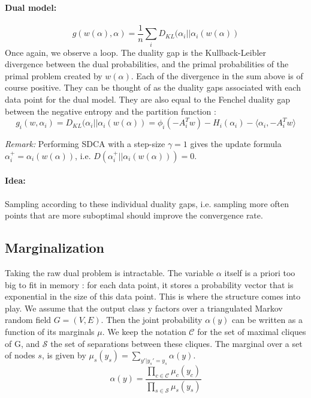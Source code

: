 \documentclass{article}
\begin{document}
\paragraph{Dual model:}

\begin{equation}
	g(w(\alpha),\alpha) = \frac{1}{n} \sum_i D_{KL} (\alpha_i || \alpha_i(w(\alpha))
\end{equation}
Once again, we observe a loop. The duality gap is the Kullback-Leibler divergence between the dual probabilities, and the primal  probabilities of the primal problem created by $w(\alpha)$. Each of the divergence in the sum above is of course positive. They can be thought of as the duality gaps associated with each data point for the dual model. They are also equal to the Fenchel duality gap between the negative entropy and the partition function :
\begin{equation*}
	g_i(w,\alpha_i) = D_{KL} (\alpha_i || \alpha_i(w(\alpha)) = \phi_i(-A_i^T w) - H_i(\alpha_i) - \langle \alpha_i, -A_i^T w\rangle 
\end{equation*}

\textit{Remark:} Performing SDCA with a step-size $\gamma=1$  gives the update formula $\alpha_i^+ = \alpha_i(w(\alpha))$, i.e. $ D(\alpha_i^+ || \alpha_i(w(\alpha)) )=0$. 

\paragraph{Idea:} Sampling according to these individual duality gaps, i.e. sampling more often points that are more suboptimal should improve the convergence rate.


\subsection{Marginalization}

Taking the raw dual problem is intractable. The variable $\alpha$ itself is a priori too big to fit in memory : for each data point, it stores a probability vector that is exponential in the size of this data point. This is where the structure comes into play. We assume that the output class y factors over a triangulated Markov random field $G=(V,E)$. Then the joint probability $\alpha(y)$ can be written as a function of its marginals $\mu$. We keep the notation $\mathcal{C}$ for the set of maximal cliques of G, and $\mathcal{S}$ the set of separations between these cliques. The marginal over a set of nodes $s$, is given by $\mu_s(y_s) = \sum_{y' | y_s'=y_s} \alpha(y)$. 
\begin{equation}
	\label{joint from marginals}
	\alpha(y) = \frac{\prod_{c\in\mathcal{C}} \mu_c(y_c)}{\prod_{s\in\mathcal{S}} \mu_s(y_s)}
\end{equation}
\end{document}
